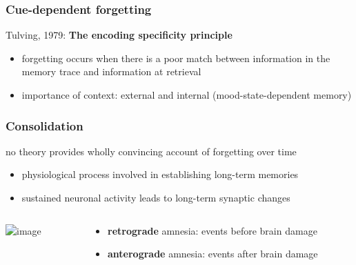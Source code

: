 \documentclass[]{beamer}
\begin{document}
\begin{frame}
 \frametitle{Cue-dependent forgetting}
\begin{overlayarea}{110mm}{80mm}
 Tulving, 1979: \textbf{The encoding specificity principle}
\begin{itemize}
 \item forgetting occurs when there is a poor match between information in the memory trace and information at retrieval
 \item importance of context: external and internal (mood-state-dependent memory)
\end{itemize}
\end{overlayarea}
\end{frame} 


\begin{frame}
\frametitle{Consolidation}
\begin{overlayarea}{110mm}{80mm}
no theory provides wholly convincing account of forgetting over time \\
\begin{itemize}
  \item<2-> physiological process involved in establishing long-term memories
 \item<3-> sustained neuronal activity leads to long-term synaptic changes
 \end{itemize}

\begin{columns}[T]
 \begin{column}{60mm}
\centering
\includegraphics<2->[width=55mm]{figs/l10/consolidation.jpg}
 \end{column}

 \begin{column}{50mm}
  \begin{itemize}
   \item<4-> \textbf{retrograde} amnesia: events before brain damage
   \item<4-> \textbf{anterograde} amnesia: events after brain damage
  \end{itemize}

 \end{column}
\end{columns}


\end{overlayarea}
\end{frame}
\end{document}
